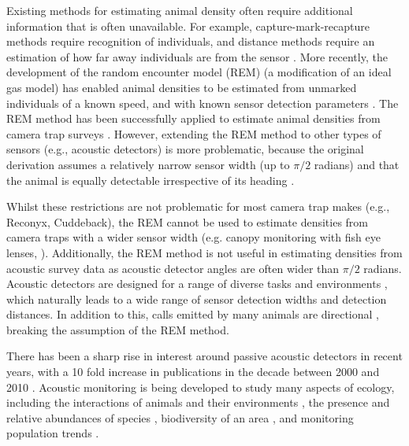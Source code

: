 \documentclass[a4paper,10pt,reqno,oneside]{amsart}
\begin{document}
Existing methods for estimating animal density often require additional information that is often unavailable. For example, capture-mark-recapture methods \citep{karanth1995estimating, trolle2007camera, borchers2014continuous} require recognition of individuals, and distance methods \citep{harris2013applying} require an estimation of how far away individuals are from the sensor \citep{barlow2005estimates, marques2011estimating}. More recently, the development of the random encounter model (REM) (a modification of an ideal gas model) has enabled animal densities to be estimated from unmarked individuals of a known speed, and with known sensor detection parameters \citep{rowcliffe2008estimating}. The REM method has been successfully applied to estimate animal densities from camera trap surveys \citep{manzo2012estimation, zero2013monitoring}. However, extending the REM method to other types of sensors (e.g., acoustic detectors) is more problematic, because the original derivation assumes a relatively narrow sensor width (up to $\pi/2$ radians) and that the animal is equally detectable irrespective of its heading \citep{rowcliffe2008estimating}. 

Whilst these restrictions are not problematic for most camera trap makes (e.g., Reconyx, Cuddeback), the REM cannot be used to estimate densities from camera traps with a wider sensor width (e.g. canopy monitoring with fish eye lenses, \citet{brusa2014increasing}). Additionally, the REM method is not useful in estimating densities from acoustic survey data as acoustic detector angles are often wider than $\pi/2$ radians.  Acoustic detectors are designed for a range of diverse tasks and environments \citep{kessel2014review}, which naturally leads to a wide range of sensor detection widths and detection distances. In addition to this, calls emitted by many animals are directional \citep{blumstein2011acoustic}, breaking the assumption of the REM method. 

There has been a sharp rise in interest around passive acoustic detectors in recent years, with a 10 fold increase in publications in the decade between 2000 and 2010 \citep{kessel2014review}. Acoustic monitoring is being developed to study many aspects of ecology, including the interactions of animals and their environments \citep{blumstein2011acoustic, rogers2013density}, the presence and relative abundances of species \citep{marcoux2011local}, biodiversity of an area \citep{depraetere2012monitoring}, and monitoring population trends \citep{walters2013challenges}. 
\end{document}
